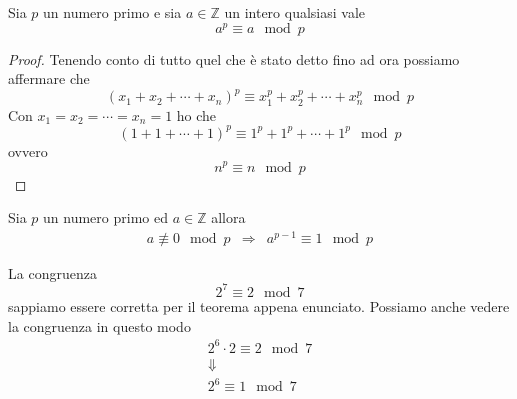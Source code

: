 \begin{theorem}
	Sia $p$ un numero primo e sia $a \in \mathbb{Z}$ un intero qualsiasi vale
	\begin{equation*}
		a^p \equiv a \mod{p}
	\end{equation*}
	\begin{proof}
		Tenendo conto di tutto quel che \`e stato detto fino ad ora possiamo affermare che
		\begin{equation*}
			(x_1 + x_2 + \cdots + x_n)^p \equiv x_1^p + x_2^p + \cdots + x_n^p \mod{p}
		\end{equation*}
		Con $x_1 = x_2 = \cdots = x_n = 1$ ho che
		\begin{equation*}
			(1 + 1 + \cdots + 1)^p \equiv 1^p + 1^p + \cdots + 1^p \mod{p}
		\end{equation*}
		ovvero
		\begin{equation*}
			n^p \equiv n \mod{p}
		\end{equation*}
	\end{proof}
\end{theorem}

\begin{corollary}
	Sia $p$ un numero primo ed $a \in \mathbb{Z}$ allora
	\begin{equation*}
		\begin{array}{ccc}
			a \not \equiv 0 \mod{p} & \Rightarrow & a^{p-1} \equiv 1 \mod{p}
		\end{array}
	\end{equation*}
\end{corollary}

\begin{example}
	La congruenza
	\begin{equation*}
		2^7 \equiv 2 \mod{7}
	\end{equation*}
	sappiamo essere corretta per il teorema appena enunciato.
	Possiamo anche vedere la congruenza in questo modo
	\begin{equation*}
		\begin{array}{c}
			2^6 \cdot 2 \equiv 2 \mod{7} \\
			\Downarrow                   \\
			2^6 \equiv 1 \mod{7}
		\end{array}
	\end{equation*}
\end{example}


